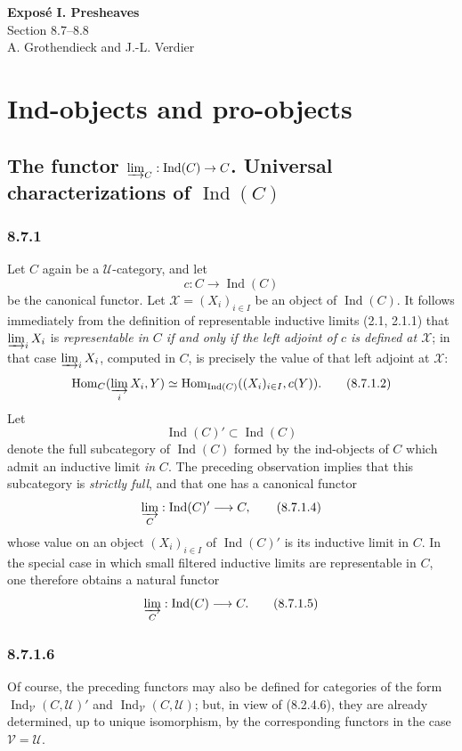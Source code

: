 \documentclass[11pt]{article}
\newcommand{\U}{\mathcal{U}}
\newcommand{\V}{\mathcal{V}}
\newcommand{\Hom}{\operatorname{Hom}}
\newcommand{\Ind}{\operatorname{Ind}}
\begin{document}
\begin{center}
{\Large \textbf{Expos\'e I. Presheaves}}\\[0.35em]
{\large Section 8.7--8.8}\\[0.35em]
A. Grothendieck and J.-L. Verdier
\end{center}

\bigskip


\setcounter{section}{7}
\section{Ind-objects and pro-objects}

\setcounter{subsection}{6}
\subsection{The functor \texorpdfstring{$\varinjlim_C:\Ind(C)\to C$}{colim\_C: Ind(C) -> C}. Universal characterizations of \texorpdfstring{$\Ind(C)$}{Ind(C)}}

\subsubsection*{8.7.1}
Let $C$ again be a $\U$-category, and let
\[
 c:C\longrightarrow \Ind(C)
\tag{8.7.1.1}
\]
be the canonical functor. Let $\mathcal X=(X_i)_{i\in I}$ be an object of $\Ind(C)$. It follows immediately from the definition of representable inductive limits (2.1, 2.1.1) that $\varinjlim_i X_i$ is \emph{representable in $C$ if and only if the left adjoint of $c$ is defined at $\mathcal X$}; in that case $\varinjlim_i X_i$, computed in $C$, is precisely the value of that left adjoint at $\mathcal X$:
\[
\Hom_C(\varinjlim_i X_i,Y)\simeq
\Hom_{\Ind(C)}((X_i)_{i\in I},c(Y)).
\tag{8.7.1.2}
\]
Let
\[
\Ind(C)'\subset \Ind(C)
\tag{8.7.1.3}
\]
denote the full subcategory of $\Ind(C)$ formed by the ind-objects of $C$ which admit an inductive limit \emph{in} $C$. The preceding observation implies that this subcategory is \emph{strictly full}, and that one has a canonical functor
\[
\varinjlim_C:\Ind(C)'\longrightarrow C,
\tag{8.7.1.4}
\]
whose value on an object $(X_i)_{i\in I}$ of $\Ind(C)'$ is its inductive limit in $C$. In the special case in which small filtered inductive limits are representable in $C$, one therefore obtains a natural functor
\[
\varinjlim_C:\Ind(C)\longrightarrow C.
\tag{8.7.1.5}
\]

\subsubsection*{8.7.1.6}
Of course, the preceding functors may also be defined for categories of the form $\Ind_{\V}(C,\U)'$ and $\Ind_{\V}(C,\U)$; but, in view of (8.2.4.6), they are already determined, up to unique isomorphism, by the corresponding functors in the case $\V=\U$.
\end{document}
